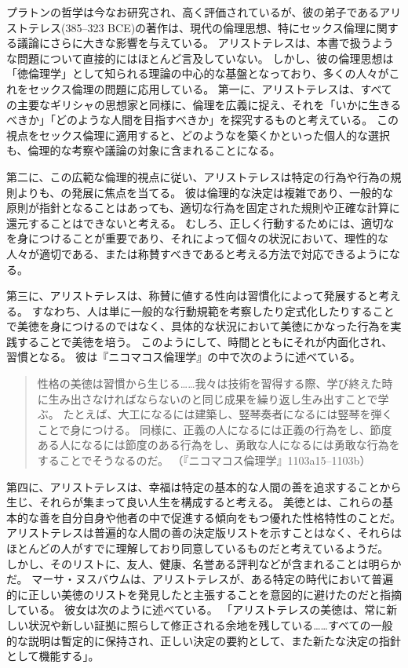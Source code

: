 \documentclass[paper=a4,book,openany]{jlreq} \usepackage{mystyle}
\begin{document}
プラトンの哲学は今なお研究され、高く評価されているが、彼の弟子であるアリストテレス(385--323 BCE)の著作は、現代の倫理思想、特にセックス倫理に関する議論にさらに大きな影響を与えている。
アリストテレスは、本書で扱うような問題について直接的にはほとんど言及していない。
しかし、彼の倫理思想は「徳倫理学」として知られる理論の中心的な基盤となっており、多くの人々がこれをセックス倫理の問題に応用している。
第一に、アリストテレスは、すべての主要なギリシャの思想家と同様に、倫理を広義に捉え、それを「いかに生きるべきか」「どのような人間を目指すべきか」を探究するものと考えている。
この視点をセックス倫理に適用すると、どのようなを築くかといった個人的な選択も、倫理的な考察や議論の対象に含まれることになる。

第二に、この広範な倫理的視点に従い、アリストテレスは特定の行為や行為の規則よりも、の発展に焦点を当てる。
彼は倫理的な決定は複雑であり、一般的な原則が指針となることはあっても、適切な行為を固定された規則や正確な計算に還元することはできないと考える。
むしろ、正しく行動するためには、適切なを身につけることが重要であり、それによって個々の状況において、理性的な人々が適切である、または称賛すべきであると考える方法で対応できるようになる。

第三に、アリストテレスは、称賛に値する性向は習慣化によって発展すると考える。
すなわち、人は単に一般的な行動規範を考察したり定式化したりすることで美徳を身につけるのではなく、具体的な状況において美徳にかなった行為を実践することで美徳を培う。
このようにして、時間とともにそれが内面化され、習慣となる。
彼は『ニコマコス倫理学』の中で次のように述べている。

\begin{quote}
  性格の美徳は習慣から生じる……我々は技術を習得する際、学び終えた時に生み出さなければならないのと同じ成果を繰り返し生み出すことで学ぶ。
たとえば、大工になるには建築し、竪琴奏者になるには竪琴を弾くことで身につける。
同様に、正義の人になるには正義の行為をし、節度ある人になるには節度のある行為をし、勇敢な人になるには勇敢な行為をすることでそうなるのだ。
（『ニコマコス倫理学』1103a15--1103b）
\end{quote}

第四に、アリストテレスは、幸福は特定の基本的な人間の善を追求することから生じ、それらが集まって良い人生を構成すると考える。
美徳とは、これらの基本的な善を自分自身や他者の中で促進する傾向をもつ優れた性格特性のことだ。
アリストテレスは普遍的な人間の善の決定版リストを示すことはなく、それらはほとんどの人がすでに理解しており同意しているものだと考えているようだ。
しかし、そのリストに、友人、健康、名誉ある評判などが含まれることは明らかだ。
マーサ・ヌスバウムは、アリストテレスが、ある特定の時代において普遍的に正しい美徳のリストを発見したと主張することを意図的に避けたのだと指摘している。
彼女は次のように述べている。
「アリストテレスの美徳は、常に新しい状況や新しい証拠に照らして修正される余地を残している……すべての一般的な説明は暫定的に保持され、正しい決定の要約として、また新たな決定の指針として機能する」\citep[pp.259--260]{nussbaum93:_non_relat_virtues}。
\end{document}
